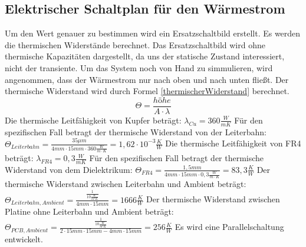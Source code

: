 \documentclass[10pt,a4paper,oneside,abstracton]{scrartcl}
\begin{document}
\begin{multicols}{2}
\subsection{Elektrischer Schaltplan für den Wärmestrom }
Um den Wert genauer zu bestimmen wird ein Ersatzschaltbild erstellt.
Es werden die thermischen Widerstände berechnet. 
Das Ersatzschaltbild wird ohne thermische Kapazitäten dargestellt, da uns der statische Zustand interessiert, nicht der transiente.
Um das System noch von Hand zu simmulieren, wird angenommen, dass der Wärmestrom nur nach oben und nach unten fließt. 
Der thermische Widerstand wird durch Formel \ref*{thermischerWiderstand} berechnet. 
\begin{equation}
	\Theta =  \frac{höhe}{A \cdot \lambda}
	\label{thermischerWiderstand}
\end{equation}
\newline \noindent
Die thermische Leitfähigkeit von Kupfer beträgt:  \newline 
$\lambda_{Cu} = 360 \frac{W}{m K}$  \cite{Waermefluss} \newline
Für den spezifischen Fall betragt der thermische Widerstand von der Leiterbahn:  \newline
$\Theta_{Leiterbahn} = \frac{35 \mu m}{4mm \cdot 15mm \cdot 360 \frac{W}{m\cdot K}} = 1,62\cdot 10^{-3} \frac{K}{W}$
\newline \noindent
Die thermische Leitfähigkeit von FR4 beträgt: 
\newline
 $\lambda_{FR4} = 0,3 \frac{W}{m K}$ \cite{Waermefluss} \newline
Für den spezifischen Fall betragt der thermische Widerstand von dem Dielektrikum: 
\newline
$\Theta_{FR4} = \frac{1,5 mm}{4mm \cdot 15mm \cdot 0,3 \frac{W}{m\cdot K}} = 83,3 \frac{K}{W}$
\newline
Der thermische Widerstand zwischen Leiterbahn und Ambient beträgt: 
\newline
$\Theta_{Leiterbahn, Ambient} =  \frac{\frac{1}{10 \frac{W}{m^2K}}}{  4mm \cdot 15mm} = 1666 \frac{K}{W} $
\newline
Der thermische Widerstand zwischen Platine ohne Leiterbahn und Ambient beträgt: 
\newline
$\Theta_{PCB, Ambient} = \frac{\frac{1}{10 \frac{W}{m^2K}}}{ 2\cdot 15mm \cdot 15mm - 4mm \cdot 15mm} = 256 \frac{K}{W} $
\newline
Es wird eine Parallelschaltung entwickelt. 
\newline

\end{multicols}
\end{document}
